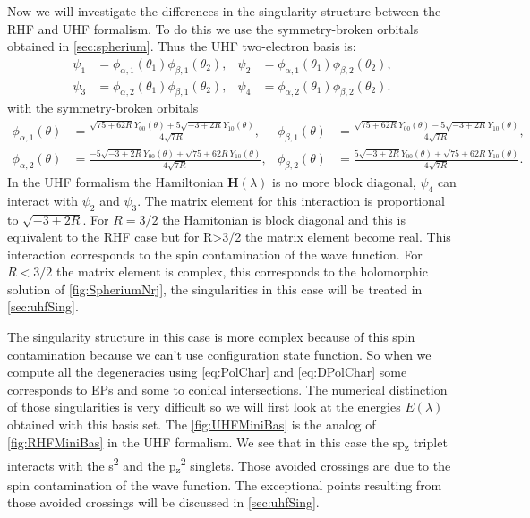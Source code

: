 \documentclass[11pt,a4paper]{article}
\newcommand{\bH}{\mathbf{H}}
\begin{document}
Now we will investigate the differences in the singularity structure between the RHF and UHF formalism. To do this we use the symmetry-broken orbitals obtained in \autoref{sec:spherium}. Thus the UHF two-electron basis is:
\begin{align}\label{eq:uhfbasis}
 \psi_1 & =\phi_{\alpha,1}(\theta_1)\phi_{\beta,1}(\theta_2),
 & 
 \psi_2 & =\phi_{\alpha,1}(\theta_1)\phi_{\beta,2}(\theta_2),\\
 \psi_3 & =\phi_{\alpha,2}(\theta_1)\phi_{\beta,1}(\theta_2),
 & 
 \psi_4 & =\phi_{\alpha,2}(\theta_1)\phi_{\beta,2}(\theta_2).
\end{align}
with the symmetry-broken orbitals
\begin{align*}\label{eq:uhforbitals}
 \phi_{\alpha,1}(\theta) & =\frac{\sqrt{75+62R}Y_{00}(\theta)+5\sqrt{-3+2R}Y_{10}(\theta)}{4\sqrt{7R}},
 & 
 \phi_{\beta,1}(\theta) & =\frac{\sqrt{75+62R}Y_{00}(\theta)-5\sqrt{-3+2R}Y_{10}(\theta)}{4\sqrt{7R}},\\
 \phi_{\alpha,2}(\theta) & =\frac{-5\sqrt{-3+2R}Y_{00}(\theta)+\sqrt{75+62R}Y_{10}(\theta)}{4\sqrt{7R}},
 & 
 \phi_{\beta,2}(\theta) & =\frac{5\sqrt{-3+2R}Y_{00}(\theta)+\sqrt{75+62R}Y_{10}(\theta)}{4\sqrt{7R}}.
\end{align*}
In the UHF formalism the Hamiltonian $\bH(\lambda)$ is no more block diagonal, $\psi_4$ can interact with $\psi_2$ and $\psi_3$. The matrix element for this  interaction is proportional to $\sqrt{-3+2R}$. For $R=3/2$ the Hamitonian is block diagonal and this is equivalent to the RHF case but for R>3/2 the matrix element become real. This interaction corresponds to the spin contamination of the wave function. For $R<3/2$ the matrix element is complex, this corresponds to the holomorphic solution of \autoref{fig:SpheriumNrj}, the singularities in this case will be treated in \autoref{sec:uhfSing}.

The singularity structure in this case is more complex because of this spin contamination because we can't use configuration state function. So when we compute all the degeneracies using \eqref{eq:PolChar} and \eqref{eq:DPolChar} some corresponds to EPs and some to conical intersections. The numerical distinction of those singularities is very difficult so we will first look at the energies $E(\lambda)$ obtained with this basis set. The \autoref{fig:UHFMiniBas} is the analog of \autoref{fig:RHFMiniBas} in the UHF formalism. We see that in this case the sp\textsubscript{z} triplet interacts with the s\textsuperscript{2} and the p\textsubscript{z}\textsuperscript{2} singlets. Those avoided crossings are due to the spin contamination of the wave function. The exceptional points resulting from those avoided crossings will be discussed in \autoref{sec:uhfSing}. \\
\end{document}
